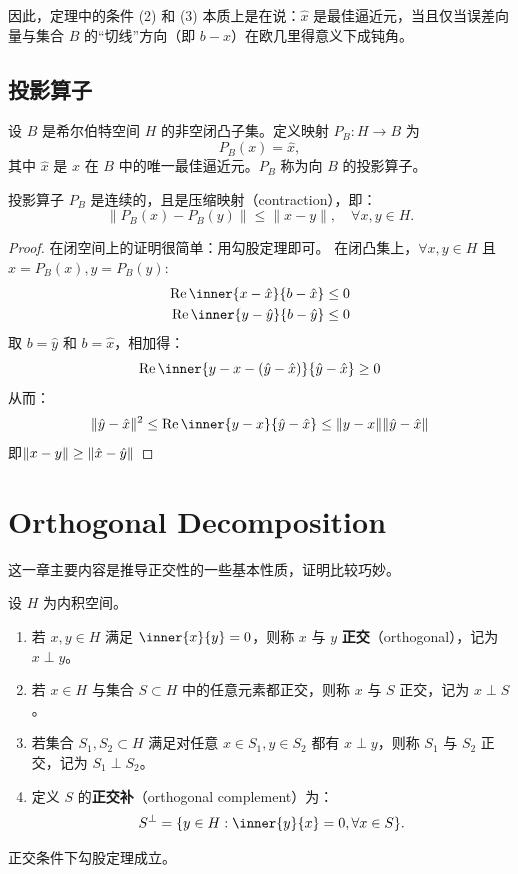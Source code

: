 因此，定理中的条件 (2) 和 (3) 本质上是在说：\(\hat{x}\) 是最佳逼近元，当且仅当误差向量与集合 \(B\)
的“切线”方向（即 \(b - \hat{x}\)）在欧几里得意义下成钝角。

\subsection{投影算子}

\begin{definition}[投影算子]
    设 \(B\) 是希尔伯特空间 \(H\) 的非空闭凸子集。定义映射 \(P_B: H \to B\) 为
    \[ P_B(x) = \hat{x}, \]
    其中 \(\hat{x}\) 是 \(x\) 在 \(B\) 中的唯一最佳逼近元。\(P_B\) 称为向 \(B\)
    的投影算子。
\end{definition}

\begin{corollary}[压缩性质]
    投影算子 \(P_B\) 是连续的，且是压缩映射（contraction），即：
    \[
        \|P_B(x) - P_B(y)\| \le \|x - y\|, \quad \forall x, y \in H.
    \]
\end{corollary}

\begin{proof}
    在闭空间上的证明很简单：用勾股定理即可。
    在闭凸集上，\(\forall x, y \in H\) 且\(x=P_{B}(x), y=P_{B}(y)\):
    \begin{align*}
        \Re \inner{x-\hat{x}}{b-\hat{x}} &\le 0 \\
        \Re \inner{y-\hat{y}}{b-\hat{y}} &\le 0
    \end{align*}
    取 \(b = \hat{y}\) 和 \(b = \hat{x}\)，相加得：
    \[
        \Re \inner{y-x-(\hat{y} - \hat{x})}{\hat{y} - \hat{x}} \geq  0
    \]
    从而：
    \[
        \|\hat{y} - \hat{x}\|^2 \leq \Re \inner{y - x}{\hat{y} - \hat{x}} \leq
        \|y - x\| \|\hat{y} - \hat{x}\|
    \]
    即\(\lVert x-y\rVert\geq \lVert\hat{x}-\hat{y}\rVert\)
\end{proof}
\section{Orthogonal Decomposition}

这一章主要内容是推导正交性的一些基本性质，证明比较巧妙。
\begin{definition}[Orthogonality]
    设 \(H\) 为内积空间。
    \begin{enumerate}
        \item 若 \(x, y \in H\) 满足 \(\inner{x}{y} = 0\)，则称 \(x\) 与
            \(y\) \textbf{正交}（orthogonal），记为 \(x \perp y\)。
        \item 若 \(x \in H\) 与集合 \(S \subset H\) 中的任意元素都正交，则称 \(x\) 与
            \(S\) 正交，记为 \(x \perp S\)。
        \item 若集合 \(S_1, S_2 \subset H\) 满足对任意 \(x \in S_1, y \in
            S_2\) 都有 \(x \perp y\)，则称 \(S_1\) 与 \(S_2\) 正交，记为
            \(S_1 \perp S_2\)。
        \item 定义 \(S\) 的\textbf{正交补}（orthogonal complement）为：
            \[
                S^\perp = \{y \in H : \inner{y}{x} = 0,
                \forall x \in S\}.
            \]
    \end{enumerate}
\end{definition}
正交条件下勾股定理成立。


